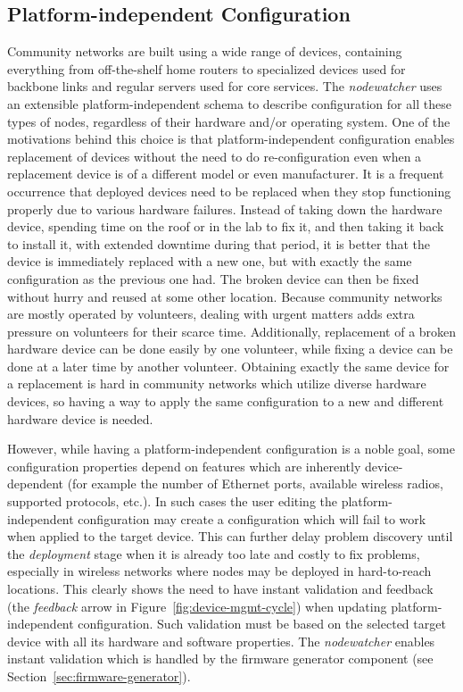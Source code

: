 \documentclass[5p,sort&compress]{elsarticle}
\newcommand{\nodewatcher}{\textit{nodewatcher}}
\begin{document}
\subsection{Platform-independent Configuration}
\label{sec:platform-independent-configuration}

Community networks are built using a wide range of devices, containing everything from off-the-shelf home routers to specialized devices used for backbone links and regular servers used for core services.
The \nodewatcher{} uses an extensible platform-independent schema to describe configuration for all these types of nodes, regardless of their hardware and/or operating system.
One of the motivations behind this choice is that platform-independent configuration enables replacement of devices without the need to do re-configuration even when a replacement device is of a different model or even manufacturer.
It is a frequent occurrence that deployed devices need to be replaced when they stop functioning properly due to various hardware failures.
Instead of taking down the hardware device, spending time on the roof or in the lab to fix it, and then taking it back to install it, with extended downtime during that period, it is better that the device is immediately replaced with a new one, but with exactly the same configuration as the previous one had.
The broken device can then be fixed without hurry and reused at some other location.
Because community networks are mostly operated by volunteers, dealing with urgent matters adds extra pressure on volunteers for their scarce time.
Additionally, replacement of a broken hardware device can be done easily by one volunteer, while fixing a device can be done at a later time by another volunteer.
Obtaining exactly the same device for a replacement is hard in community networks which utilize diverse hardware devices, so having a way to apply the same configuration to a new and different hardware device is needed.

However, while having a platform-independent configuration is a noble goal, some configuration properties depend on features which are inherently device-dependent (for example the number of Ethernet ports, available wireless radios, supported protocols, etc.).
In such cases the user editing the platform-independent configuration may create a configuration which will fail to work when applied to the target device.
This can further delay problem discovery until the \textit{deployment} stage when it is already too late and costly to fix problems, especially in wireless networks where nodes may be deployed in hard-to-reach locations.
This clearly shows the need to have instant validation and feedback (the \textit{feedback} arrow in Figure~\ref{fig:device-mgmt-cycle}) when updating platform-independent configuration.
Such validation must be based on the selected target device with all its hardware and software properties.
The \nodewatcher{} enables instant validation which is handled by the firmware generator component (see Section~\ref{sec:firmware-generator}).
\end{document}
